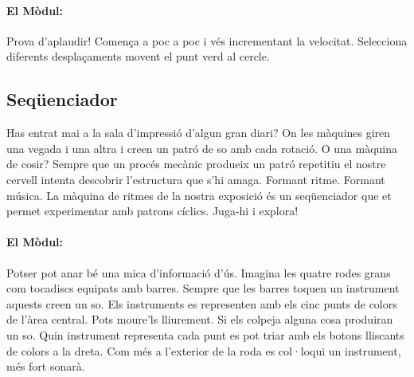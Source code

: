 \hfill {}
\paragraph{El Mòdul:}
Prova d'aplaudir! Comença a poc a poc i vés incrementant la velocitat. Selecciona diferents desplaçaments movent el punt verd al cercle.

\vspace{12ex}

\subsection{Seqüenciador}
Has entrat mai a la sala d'impressió d'algun gran diari?
On les màquines giren una vegada i una altra i creen un patró de so amb cada rotació. O una màquina de cosir? Sempre que un procés mecànic produeix un patró repetitiu el nostre cervell intenta descobrir l'estructura que s'hi amaga. Formant ritme. Formant música. La màquina de ritmes de la nostra exposició és un seqüenciador que et permet experimentar amb patrons cíclics. Juga-hi i explora!

\paragraph{El Mòdul:}
Potser pot anar bé una mica d'informació d'ús. Imagina les quatre rodes grans com tocadiscs equipats amb barres. Sempre que les barres toquen un instrument aquests creen un so. Els instruments es representen amb els cinc punts de colors de l'àrea central. Pots moure'ls lliurement. Si els colpeja alguna cosa produiran un so. Quin instrument representa cada punt es pot triar amb els botons lliscants de colors a la dreta. Com més a l'exterior de la roda es col·loqui un instrument, més fort sonarà.

